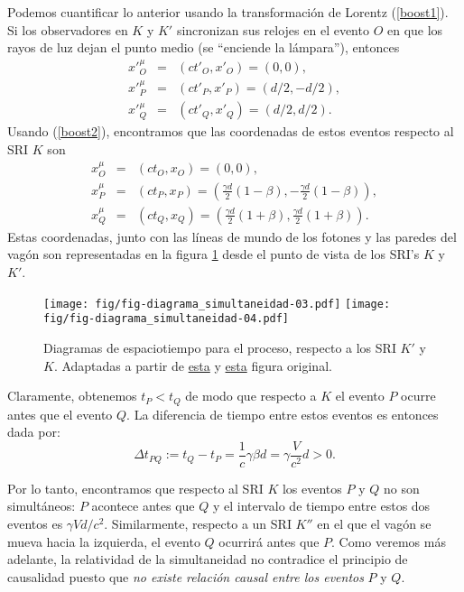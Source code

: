 Podemos cuantificar lo anterior usando la transformación de Lorentz (\ref{boost1}). Si los observadores en $K$ y $K'$ sincronizan sus relojes en el evento $O$ en que los rayos de luz dejan el punto medio (se ``enciende la lámpara''), entonces
\begin{eqnarray}
x'^\mu_O&=&(ct'_O,x'_O)=(0,0), \\
x'^\mu_P&=&(ct'_P,x'_P)=(d/2,-d/2), \\
x'^\mu_Q&=&(ct'_Q,x'_Q)=(d/2,d/2).
\end{eqnarray}
Usando (\ref{boost2}), encontramos que las coordenadas de estos eventos respecto al SRI $K$ son
\begin{eqnarray}
x^\mu_O&=&(ct_O,x_O)=(0,0), \\
x^\mu_P&=&(ct_P,x_P)=\left(\frac{\gamma d}{2}(1-\beta),-\frac{\gamma d}{2} (1-\beta)\right), \\
x^\mu_Q&=&(ct_Q,x_Q)=\left(\frac{\gamma d}{2}(1+\beta),\frac{\gamma d}{2} (1+\beta)\right).
\end{eqnarray}
Estas coordenadas, junto con las líneas de mundo de los fotones y las paredes del vagón son representadas en la figura \ref{sim03-04} desde el punto de vista de los SRI's $K$ y $K'$.
\begin{figure}[!h]
\centerline{\texttt{[image: fig/fig-diagrama\_simultaneidad-03.pdf]}\hspace{1cm}
\texttt{[image: fig/fig-diagrama\_simultaneidad-04.pdf]}}
\caption{Diagramas de espaciotiempo para el proceso, respecto a los SRI $K'$ y $K$. Adaptadas a partir de \href{https://en.wikipedia.org/wiki/File:TrainAndPlatformDiagram1.svg}{esta} y \href{https://en.wikipedia.org/wiki/File:TrainAndPlatformDiagram2.svg}{esta} figura original.}
\label{sim03-04}
\end{figure}

Claramente, obtenemos $t_P<t_Q$ de modo que respecto a $K$ el evento $P$ ocurre antes que el evento $Q$. La diferencia de tiempo entre estos eventos es entonces dada por:
\begin{equation}
 \Delta t_{PQ}:=t_Q-t_P=\frac{1}{c}\gamma \beta d=\gamma\frac{V}{c^2}d >0.
\end{equation}


Por lo tanto, encontramos que respecto al SRI $K$ los eventos $P$ y $Q$ no son simultáneos: $P$ acontece antes que $Q$ y el intervalo de tiempo entre estos dos eventos es $\gamma{V}d/{c^2}$. Similarmente, respecto a un SRI $K''$ en el que el vagón se mueva hacia la izquierda, el evento $Q$ ocurrirá antes que $P$. Como veremos más adelante, la relatividad de la simultaneidad no contradice el principio de causalidad puesto que \textit{no existe relación causal entre los eventos} $P$ y $Q$.



